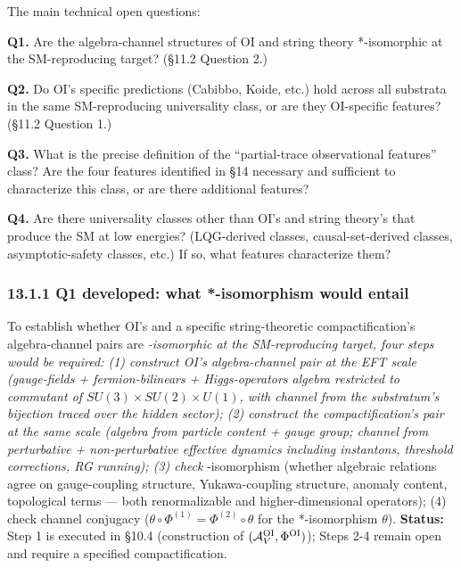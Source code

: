 \documentclass[
]{article}
\begin{document}
The main technical open questions:

\textbf{Q1.} Are the algebra-channel structures of OI and string theory
*-isomorphic at the SM-reproducing target? (§11.2 Question 2.)

\textbf{Q2.} Do OI's specific predictions (Cabibbo, Koide, etc.) hold
across all substrata in the same SM-reproducing universality class, or
are they OI-specific features? (§11.2 Question 1.)

\textbf{Q3.} What is the precise definition of the ``partial-trace
observational features'' class? Are the four features identified in §14
necessary and sufficient to characterize this class, or are there
additional features?

\textbf{Q4.} Are there universality classes other than OI's and string
theory's that produce the SM at low energies? (LQG-derived classes,
causal-set-derived classes, asymptotic-safety classes, etc.) If so, what
features characterize them?

\hypertarget{q1-developed-what--isomorphism-would-entail}{%
\subsubsection{13.1.1 Q1 developed: what *-isomorphism would
entail}\label{q1-developed-what--isomorphism-would-entail}}

To establish whether OI's and a specific string-theoretic
compactification's algebra-channel pairs are \emph{-isomorphic at the
SM-reproducing target, four steps would be required: (1) construct OI's
algebra-channel pair at the EFT scale (gauge-fields + fermion-bilinears
+ Higgs-operators algebra restricted to commutant of
\(SU(3) \times SU(2) \times U(1)\), with channel from the substratum's
bijection traced over the hidden sector); (2) construct the
compactification's pair at the same scale (algebra from particle content
+ gauge group; channel from perturbative + non-perturbative effective
dynamics including instantons, threshold corrections, RG running); (3)
check }-isomorphism (whether algebraic relations agree on gauge-coupling
structure, Yukawa-coupling structure, anomaly content, topological terms
--- both renormalizable and higher-dimensional operators); (4) check
channel conjugacy (\(\theta \circ \Phi^{(1)} = \Phi^{(2)} \circ \theta\)
for the *-isomorphism \(\theta\)). \textbf{Status:} Step 1 is executed
in §10.4 (construction of \((\mathcal{A}_V^{\rm OI}, \Phi^{\rm OI})\));
Steps 2-4 remain open and require a specified compactification.
\end{document}
